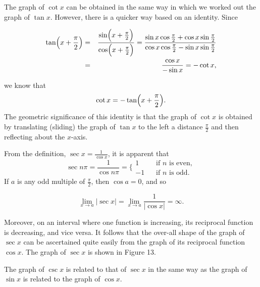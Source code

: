 The graph of $\cot x$ can be obtained in the same way in which we worked out the graph of $\tan x$. However, there is a quicker way based on an identity. Since 

\begin{eqnarray*}
\tan \Bigl(x + \frac{\pi}{2} \Bigr) &=& \frac{\sin \Bigl(x + \frac{\pi}{2} \Bigr)}{ \cos \Bigl(x + \frac{\pi}{2} \Bigr)} 
= \frac{\sin x \cos \frac{\pi}{2} + \cos x \sin \frac{\pi}{2}}{ \cos x \cos\frac{\pi}{2} 
- \sin x \sin \frac{\pi}{2}}  \\
&=& \frac{\cos x}{-\sin x} = - \cot x ,
\end{eqnarray*}

\noindent we know that
$$
\cot x = - \tan \Bigl(x + \frac{\pi}{2}\Bigr) .
$$
\noindent The geometric significance of this identity is that the graph of $\cot x$ is obtained by translating (sliding) the graph of $\tan x$ to the left a distance $\frac{\pi}{2}$ and then reflecting about the $x$-axis.

From the definition, $\sec x = \frac{1}{\cos x}$, it is apparent that
$$
\sec n \pi = \frac{1}{\cos n\pi} = \{ \begin{array}{rl}
1  &\;\;\;  \mbox{if $n$ is even}, \\
-1 & \;\;\; \mbox{if $n$ is odd}.
\end{array}
$$
\noindent If $a$ is any odd multiple of $\frac{\pi}{2}$, then $\cos a = 0$, and so 

$$
\lim_{x \rightarrow a} |\sec x| = \lim_{x \rightarrow a} \frac{1}{|\cos x|} = \infty.  
$$

\noindent Moreover, on an interval where one function is increasing, its reciprocal function is decreasing, and vice versa. It follows that the over-all shape of the graph of $\sec x$ can be ascertained quite easily from the graph of its reciprocal function $\cos x$. The graph of $\sec x$ is shown in Figure 13.

The graph of $\csc x$ is related to that of $\sec x$ in the same way as the graph of $\sin x$ is related to the graph of $\cos x$.

